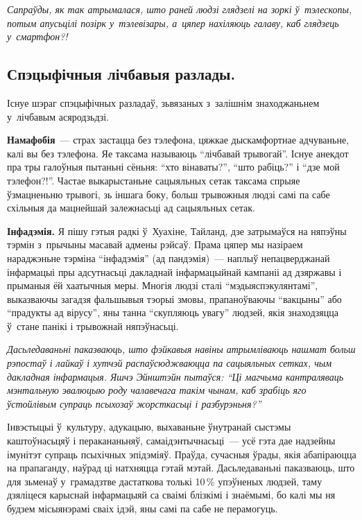 \emph{Сапраўды, як так атрымалася, што раней людзі глядзелі на зоркі ў~тэлескопы, потым апусьцілі позірк у~тэлевізары, а~цяпер нахіляюць галаву, каб глядзець у~смартфон?!}

\subsection*{Спэцыфічныя лічбавыя разлады.}

Існуе шэраг спэцыфічных разладаў, зьвязаных з~залішнім знаходжаньнем у~лічбавым асяродзьдзі.

\textbf{Намафобія}~--- страх застацца без тэлефона, цяжкае дыскамфортнае адчуваньне, калі вы без тэлефона. Яе таксама называюць ``лічбавай трывогай''. Існуе анекдот пра тры галоўныя пытаньні сёньня: ``хто вінаваты?'', ``што рабіць?'' і ``дзе мой тэлефон?!''. Частае выкарыстаньне сацыяльных сетак таксама спрыяе ўзмацненьню трывогі, зь іншага боку, больш трывожныя людзі самі па сабе схільныя да мацнейшай залежнасьці ад сацыяльных сетак.

\textbf{Інфадэмія.} Я пішу гэтыя радкі ў~Хуахіне, Тайланд, дзе затрымаўся на няпэўны тэрмін з~прычыны масавай адмены рэйсаў. Прама цяпер мы назіраем нараджэньне тэрміна ``інфадэмія'' (ад пандэмія)~--- наплыў непацверджанай інфармацыі пры адсутнасьці дакладнай інфармацыйнай кампаніі ад дзяржавы і прыманыя ёй хаатычныя меры. Многія людзі сталі ``мэдыяспэкулянтамі'', выказваючы загадзя фальшывыя тэорыі змовы, прапаноўваючы ``вакцыны'' або ``прадукты ад вірусу'', яны танна ``скупляюць увагу'' людзей, якія знаходзяцца ў~стане панікі і трывожнай няпэўнасьці.

\emph{Дасьледаваньні паказваюць, што фэйкавыя навіны атрымліваюць нашмат больш рэпостаў і лайкаў і хутчэй распаўсюджваюцца па сацыяльных сетках, чым дакладная інфармацыя. Яшчэ Эйнштэйн пытаўся: ``Ці магчыма кантраляваць мэнтальную эвалюцыю роду чалавечага такім чынам, каб зрабіць яго ўстойлівым супраць псыхозаў жорсткасьці і разбурэньня?''} 

Інвэстыцыі ў~культуру, адукацыю, выхаваньне ўнутранай сыстэмы каштоўнасьцяў і перакананьняў, самаідэнтычнасьці~--- усё гэта дае надзейны імунітэт супраць псыхічных эпідэміяў. Праўда, сучасныя ўрады, якія абапіраюцца на прапаганду, наўрад ці натхняцца гэтай мэтай. Дасьледаваньні паказваюць, што для зьменаў у~грамадзтве дастаткова толькі 10\,\% упэўненых людзей, таму дзяліцеся карыснай інфармацыяй са сваімі блізкімі і знаёмымі, бо калі мы ня будзем місыянэрамі сваіх ідэй, яны самі па сабе не перамогуць.

